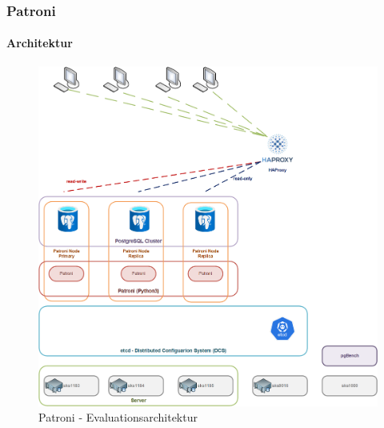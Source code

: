 
\begin{flushleft}
    \subsubsection{Patroni}
    \paragraph{Architektur}
    \begin{figure}[H]
        \centering
        \includegraphics[width=0.8\linewidth]{source/implementation/evaluation/postgresql_ha_solutions/patroni/patroni-evaluation-architecture}
        \caption{Patroni - Evaluationsarchitektur}
        \label{fig:patroni-evaluation-architecture.png}
    \end{figure}
\end{flushleft}